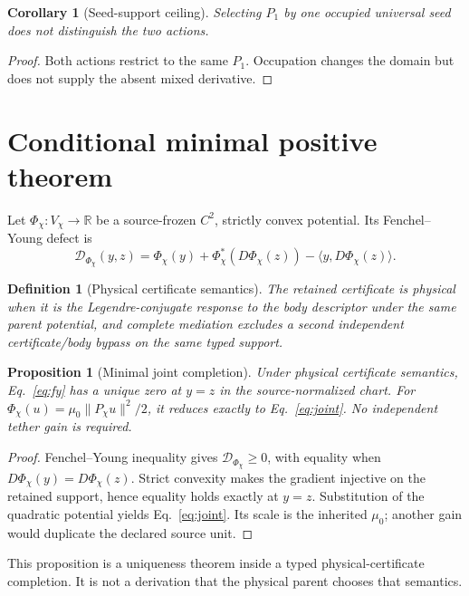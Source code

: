 \documentclass[11pt]{article}
\newtheorem{definition}{Definition}
\newtheorem{proposition}{Proposition}
\newtheorem{corollary}{Corollary}
\begin{document}
\begin{corollary}[Seed-support ceiling]
Selecting \(P_1\) by one occupied universal seed does not distinguish the two
actions.
\end{corollary}

\begin{proof}
Both actions restrict to the same \(P_1\).  Occupation changes the domain but
does not supply the absent mixed derivative.
\end{proof}

\section{Conditional minimal positive theorem}

Let \(\Phi_\chi:V_\chi\to\mathbb R\) be a source-frozen \(C^2\), strictly
convex potential.  Its Fenchel--Young defect is
\begin{equation}
 \mathcal D_{\Phi_\chi}(y,z)=
 \Phi_\chi(y)+\Phi_\chi^*(D\Phi_\chi(z))
 -\langle y,D\Phi_\chi(z)\rangle.
 \label{eq:fy}
\end{equation}

\begin{definition}[Physical certificate semantics]
The retained certificate is physical when it is the Legendre-conjugate
response to the body descriptor under the same parent potential, and complete
mediation excludes a second independent certificate/body bypass on the same
typed support.
\end{definition}

\begin{proposition}[Minimal joint completion]
Under physical certificate semantics, Eq.~\eqref{eq:fy} has a unique zero at
\(y=z\) in the source-normalized chart.  For
\(\Phi_\chi(u)=\mu_0\lVert P_\chi u\rVert^2/2\), it reduces exactly to
Eq.~\eqref{eq:joint}.  No independent tether gain is required.
\end{proposition}

\begin{proof}
Fenchel--Young inequality gives \(\mathcal D_{\Phi_\chi}\ge0\), with equality
when \(D\Phi_\chi(y)=D\Phi_\chi(z)\).  Strict convexity makes the gradient
injective on the retained support, hence equality holds exactly at \(y=z\).
Substitution of the quadratic potential yields Eq.~\eqref{eq:joint}.  Its scale
is the inherited \(\mu_0\); another gain would duplicate the declared source
unit.
\end{proof}

This proposition is a uniqueness theorem inside a typed physical-certificate
completion.  It is not a derivation that the physical parent chooses that
semantics.
\end{document}
